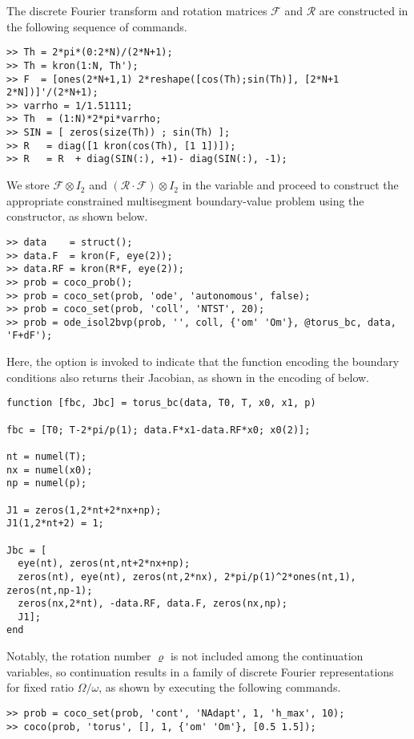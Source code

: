 The discrete Fourier transform and rotation matrices $\mathcal{F}$ and $\mathcal{R}$ are constructed in the following sequence of commands.
\begin{lstlisting}[language=coco-highlight]
>> Th = 2*pi*(0:2*N)/(2*N+1);
>> Th = kron(1:N, Th');
>> F  = [ones(2*N+1,1) 2*reshape([cos(Th);sin(Th)], [2*N+1 2*N])]'/(2*N+1);
>> varrho = 1/1.51111;
>> Th  = (1:N)*2*pi*varrho;
>> SIN = [ zeros(size(Th)) ; sin(Th) ];
>> R   = diag([1 kron(cos(Th), [1 1])]);
>> R   = R  + diag(SIN(:), +1)- diag(SIN(:), -1);
\end{lstlisting}
We store $\mathcal{F}\otimes I_2$ and $\left(\mathcal{R}\cdot\mathcal{F}\right)\otimes I_2$ in the variable  and proceed to construct the appropriate constrained multisegment boundary-value problem using the  constructor, as shown below.
\begin{lstlisting}[language=coco-highlight]
>> data    = struct();
>> data.F  = kron(F, eye(2));
>> data.RF = kron(R*F, eye(2));
>> prob = coco_prob();
>> prob = coco_set(prob, 'ode', 'autonomous', false);
>> prob = coco_set(prob, 'coll', 'NTST', 20);
>> prob = ode_isol2bvp(prob, '', coll, {'om' 'Om'}, @torus_bc, data, 'F+dF');
\end{lstlisting}
Here, the  option is invoked to indicate that the function encoding the boundary conditions also returns their Jacobian, as shown in the encoding of  below.
\begin{lstlisting}[language=coco-highlight]
function [fbc, Jbc] = torus_bc(data, T0, T, x0, x1, p)

fbc = [T0; T-2*pi/p(1); data.F*x1-data.RF*x0; x0(2)];

nt = numel(T);
nx = numel(x0);
np = numel(p);

J1 = zeros(1,2*nt+2*nx+np);
J1(1,2*nt+2) = 1;

Jbc = [
  eye(nt), zeros(nt,nt+2*nx+np);
  zeros(nt), eye(nt), zeros(nt,2*nx), 2*pi/p(1)^2*ones(nt,1), zeros(nt,np-1);
  zeros(nx,2*nt), -data.RF, data.F, zeros(nx,np);
  J1];
end
\end{lstlisting}
Notably, the rotation number $\varrho$ is not included among the continuation variables, so continuation results in a family of discrete Fourier representations for fixed ratio $\Omega/\omega$, as shown by executing the following commands.
\begin{lstlisting}[language=coco-highlight]
>> prob = coco_set(prob, 'cont', 'NAdapt', 1, 'h_max', 10);
>> coco(prob, 'torus', [], 1, {'om' 'Om'}, [0.5 1.5]);
\end{lstlisting}
\medskip

